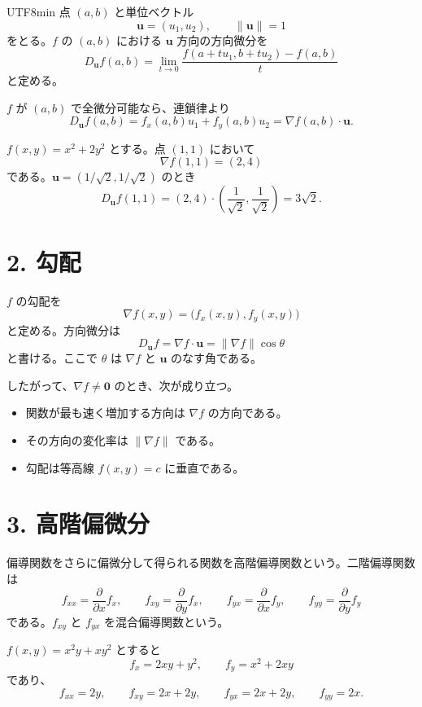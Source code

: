 \documentclass[a4paper,12pt]{article}
\begin{document}
\begin{CJK}{UTF8}{min}
点 $(a,b)$ と単位ベクトル
\[
\boldsymbol{u}=(u_1,u_2),\qquad \|\boldsymbol{u}\|=1
\]
をとる。$f$ の $(a,b)$ における $\boldsymbol{u}$ 方向の方向微分を
\[
D_{\boldsymbol{u}}f(a,b)
=\lim_{t\to0}
\frac{f(a+tu_1,b+tu_2)-f(a,b)}{t}
\]
と定める。

$f$ が $(a,b)$ で全微分可能なら、連鎖律より
\[
D_{\boldsymbol{u}}f(a,b)
=f_x(a,b)u_1+f_y(a,b)u_2
=\nabla f(a,b)\cdot\boldsymbol{u}.
\]

\begin{example}
$f(x,y)=x^2+2y^2$ とする。点 $(1,1)$ において
\[
\nabla f(1,1)=(2,4)
\]
である。$\boldsymbol{u}=(1/\sqrt2,1/\sqrt2)$ のとき
\[
D_{\boldsymbol{u}}f(1,1)
=(2,4)\cdot
\left(\frac1{\sqrt2},\frac1{\sqrt2}\right)
=3\sqrt2.
\]
\end{example}

\section*{2. 勾配}

$f$ の勾配を
\[
\nabla f(x,y)=\bigl(f_x(x,y),f_y(x,y)\bigr)
\]
と定める。方向微分は
\[
D_{\boldsymbol{u}}f
=\nabla f\cdot\boldsymbol{u}
=\|\nabla f\|\cos\theta
\]
と書ける。ここで $\theta$ は $\nabla f$ と $\boldsymbol{u}$ のなす角である。

したがって、$\nabla f\neq\boldsymbol{0}$ のとき、次が成り立つ。
\begin{itemize}
\item 関数が最も速く増加する方向は $\nabla f$ の方向である。
\item その方向の変化率は $\|\nabla f\|$ である。
\item 勾配は等高線 $f(x,y)=c$ に垂直である。
\end{itemize}

\section*{3. 高階偏微分}

偏導関数をさらに偏微分して得られる関数を高階偏導関数という。二階偏導関数は
\[
f_{xx}=\frac{\partial}{\partial x}f_x,\qquad
f_{xy}=\frac{\partial}{\partial y}f_x,\qquad
f_{yx}=\frac{\partial}{\partial x}f_y,\qquad
f_{yy}=\frac{\partial}{\partial y}f_y
\]
である。$f_{xy}$ と $f_{yx}$ を混合偏導関数という。

\begin{example}
$f(x,y)=x^2y+xy^2$ とすると
\[
f_x=2xy+y^2,\qquad f_y=x^2+2xy
\]
であり、
\[
f_{xx}=2y,\qquad
f_{xy}=2x+2y,\qquad
f_{yx}=2x+2y,\qquad
f_{yy}=2x.
\]
\end{example}


\end{CJK}
\end{document}
